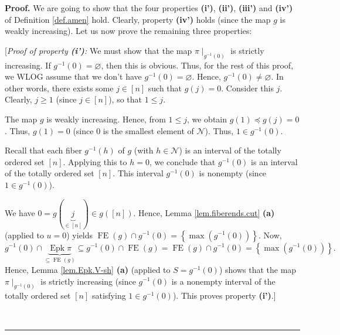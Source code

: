 \documentclass[numbers=enddot,12pt,final,onecolumn,notitlepage]{scrartcl}%
\theoremstyle{definition}
\newenvironment{proof}[1][Proof]{\noindent\textbf{#1.} }{\ \rule{0.5em}{0.5em}}
\newenvironment{verlong}{}{}
\begin{document}
\begin{verlong}
\begin{proof}
We are going to show that the four properties \textbf{(i')}, \textbf{(ii')},
\textbf{(iii')} and \textbf{(iv')} of Definition \ref{def.amen} hold. Clearly,
property \textbf{(iv')} holds (since the map $g$ is weakly increasing). Let us
now prove the remaining three properties:

[\textit{Proof of property \textbf{(i')}:} We must show that the map $\pi
\mid_{g^{-1}\left(  0\right)  }$ is strictly increasing. If $g^{-1}\left(
0\right)  =\varnothing$, then this is obvious. Thus, for the rest of this
proof, we WLOG assume that we don't have $g^{-1}\left(  0\right)
=\varnothing$. Hence, $g^{-1}\left(  0\right)  \neq\varnothing$. In other
words, there exists some $j\in\left[  n\right]  $ such that $g\left(
j\right)  =0$. Consider this $j$. Clearly, $j\geq1$ (since $j\in\left[
n\right]  $), so that $1\leq j$.

The map $g$ is weakly increasing. Hence, from $1\leq j$, we obtain $g\left(
1\right)  \preccurlyeq g\left(  j\right)  =0$. Thus, $g\left(  1\right)  =0$
(since $0$ is the smallest element of $\mathcal{N}$). Thus, $1\in
g^{-1}\left(  0\right)  $.

Recall that each fiber $g^{-1}\left(  h\right)  $ of $g$ (with $h\in
\mathcal{N}$) is an interval of the totally ordered set $\left[  n\right]  $.
Applying this to $h=0$, we conclude that $g^{-1}\left(  0\right)  $ is an
interval of the totally ordered set $\left[  n\right]  $. This interval
$g^{-1}\left(  0\right)  $ is nonempty (since $1\in g^{-1}\left(  0\right)  $).

We have $0=g\left(  \underbrace{j}_{\in\left[  n\right]  }\right)  \in
g\left(  \left[  n\right]  \right)  $. Hence, Lemma \ref{lem.fiberends.cut}
\textbf{(a)} (applied to $u=0$) yields $\operatorname*{FE}\left(  g\right)
\cap g^{-1}\left(  0\right)  =\left\{  \max\left(  g^{-1}\left(  0\right)
\right)  \right\}  $. Now,%
\[
g^{-1}\left(  0\right)  \cap\underbrace{\operatorname{Epk}\pi}_{\subseteq
\operatorname*{FE}\left(  g\right)  }\subseteq g^{-1}\left(  0\right)
\cap\operatorname*{FE}\left(  g\right)  =\operatorname*{FE}\left(  g\right)
\cap g^{-1}\left(  0\right)  =\left\{  \max\left(  g^{-1}\left(  0\right)
\right)  \right\}  .
\]
Hence, Lemma \ref{lem.Epk.V-sh} \textbf{(a)} (applied to $S=g^{-1}\left(
0\right)  $) shows that the map $\pi\mid_{g^{-1}\left(  0\right)  }$ is
strictly increasing (since $g^{-1}\left(  0\right)  $ is a nonempty interval
of the totally ordered set $\left[  n\right]  $ satisfying $1\in g^{-1}\left(
0\right)  $). This proves property \textbf{(i')}.]


\end{proof}
\end{verlong}
\end{document}
